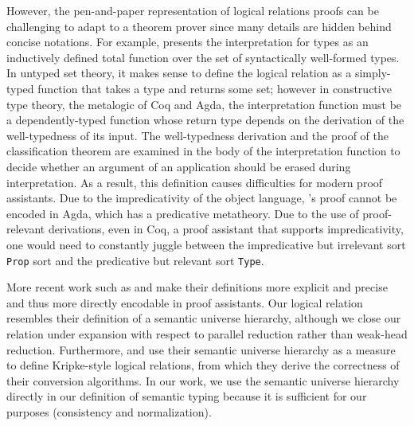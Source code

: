 \documentclass[\ifpublic nolinenum\else\fi,online,OA]{jfp}
\newcommand{\scw}[1]{}
\newcommand{\yl}[1]{}
\theoremstyle{definition}
\begin{document}
However, the pen-and-paper representation of logical relations proofs
can be challenging to adapt to a theorem prover since many details
are hidden behind concise notations.
For example, \citet{geuvers1994short} presents the interpretation for types as
an inductively defined total function over the set of syntactically
well-formed types. \scw{The issue is that Geuver's metalogic is (untyped) set
theory, but Coq and Agda use type theory.}
In untyped set theory, it makes sense to define the logical relation as a
simply-typed function that takes a type and returns some set; however
in constructive type theory, the metalogic of Coq and Agda, the
interpretation function must be a dependently-typed function whose
return type depends on the derivation of the well-typedness of its
input. The well-typedness derivation and the proof of the
classification theorem\scw{what is the classification theorem}\yl{It
  says all well-formed terms A (either G |- A : .. or G |- .. : A)
then A is either an object, a type, or a kind. The classification is
used to guide erasure}
are examined in the body
of the interpretation function to decide whether an argument of an
application should be erased during interpretation. As a result, this
definition causes difficulties for modern proof assistants.
Due to the
impredicativity of the object language, \citet{geuvers1994short}'s
proof cannot be encoded in Agda, which has a predicative
metatheory. Due to the use of proof-relevant derivations, even in
Coq, a proof assistant that supports impredicativity, one would need
to constantly juggle between the impredicative but irrelevant sort
\texttt{Prop} sort and the predicative but relevant sort
\texttt{Type}.

More recent work such as \citet{Abel12}
and \citet{abel2008betaeta} make their definitions more explicit and
precise and thus more directly encodable in proof assistants.
Our logical relation resembles their definition of a
semantic universe hierarchy, although we close our relation
under expansion with respect to parallel reduction rather
than weak-head reduction. \scw{Why is this important?} \yl{if you are
  referring to the sentence about weak-head reduction, it can
  be deleted because it's discussed in Section 9 already}
Furthermore, \citet{Abel12} and
\citet{abel2008betaeta} use their semantic universe hierarchy as a
measure to define Kripke-style logical relations, from which they
derive the correctness of their conversion algorithms. In our work, we
use the semantic universe hierarchy directly in our definition of
semantic typing because it is sufficient for our purposes
(consistency and normalization).
\end{document}
